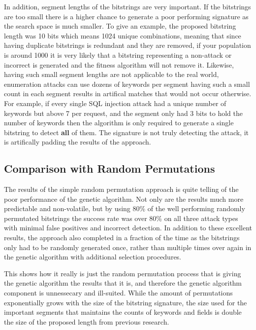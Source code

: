 In addition, segment lengths of the bitstrings are very important.  If the bitstrings are too small there is a higher chance to generate a poor performing signature as the search space is much smaller.  To give an example, the proposed bitstring length was 10 bits which means 1024 unique combinations, meaning that since having duplicate bitstrings is redundant and they are removed, if your population is around 1000 it is very likely that a bitstring representing a non-attack or incorrect is generated and the fitness algorithm will not remove it.  Likewise, having such small segment lengths are not applicable to the real world, enumeration attacks can use dozens of keywords per segment having such a small count in each segment results in artifical matches that would not occur otherwise.  For example, if every single SQL injection attack had a unique number of keywords but above 7 per request, and the segment only had 3 bits to hold the number of keywords then the algorithm is only required to generate a single bitstring to detect \textbf{all} of them.  The signature is not truly detecting the attack, it is artifically padding the results of the approach.

\subsection{Comparison with Random Permutations}\label{sec:randDiscussion}

The results of the simple random permutation approach is quite telling of the poor performance of the genetic algorithm.  Not only are the results much more predictable and non-volatile, but by using 80\% of the well performing randomly permutated bitstrings the success rate was over 80\% on all three attack types with minimal false positives and incorrect detection.  In addition to these excellent results, the approach also completed in a fraction of the time as the bitstrings only had to be randomly generated once, rather than multiple times over again in the genetic algorithm with additional selection procedures.

This shows how it really is just the random permutation process that is giving the genetic algorithm the results that it is, and therefore the genetic algorithm component is unnessecary and ill-suited.  While the amount of permutations exponentially grows with the size of the bitstring signature, the size used for the important segments that maintains the counts of keywords and fields is double the size of the proposed length from previous research.

